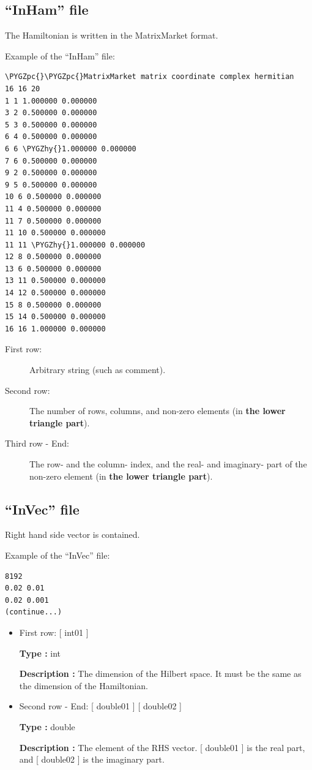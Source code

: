 \documentclass[letterpaper,10pt,dvipdfmx,openany]{sphinxmanual}
\def\PYGZpc{\char`\%}
\def\PYGZhy{\char`\-}
\begin{document}
\subsection{``InHam'' file}
\label{shiftk_format_en:ham}\label{shiftk_format_en:inham-file}
The Hamiltonian is written in the MatrixMarket format.

Example of the ``InHam'' file:

\begin{Verbatim}[commandchars=\\\{\}]
\PYGZpc{}\PYGZpc{}MatrixMarket matrix coordinate complex hermitian
16 16 20
1 1 1.000000 0.000000
3 2 0.500000 0.000000
5 3 0.500000 0.000000
6 4 0.500000 0.000000
6 6 \PYGZhy{}1.000000 0.000000
7 6 0.500000 0.000000
9 2 0.500000 0.000000
9 5 0.500000 0.000000
10 6 0.500000 0.000000
11 4 0.500000 0.000000
11 7 0.500000 0.000000
11 10 0.500000 0.000000
11 11 \PYGZhy{}1.000000 0.000000
12 8 0.500000 0.000000
13 6 0.500000 0.000000
13 11 0.500000 0.000000
14 12 0.500000 0.000000
15 8 0.500000 0.000000
15 14 0.500000 0.000000
16 16 1.000000 0.000000
\end{Verbatim}
\begin{description}
\item[{First row:}] \leavevmode
Arbitrary string (such as comment).

\item[{Second row:}] \leavevmode
The number of rows, columns, and non-zero elements
(in \textbf{the lower triangle part}).

\item[{Third row - End:}] \leavevmode
The row- and the column- index, and
the real- and imaginary- part of the non-zero element
(in \textbf{the lower triangle part}).

\end{description}


\subsection{``InVec'' file}
\label{shiftk_format_en:vec}\label{shiftk_format_en:invec-file}
Right hand side vector is contained.

Example of the ``InVec'' file:

\begin{Verbatim}[commandchars=\\\{\}]
8192
0.02 0.01
0.02 0.001
(continue...)
\end{Verbatim}
\begin{itemize}
\item {} 
First row: {[} int01 {]}

\textbf{Type :} int

\textbf{Description :}
The dimension of the Hilbert space.
It must be the same as the dimension of the Hamiltonian.

\item {} 
Second row - End:
{[} double01 {]} {[} double02 {]}

\textbf{Type :} double

\textbf{Description :} The element of the RHS vector.
{[} double01 {]} is the real part,
and {[} double02 {]} is the imaginary part.

\end{itemize}
\end{document}
